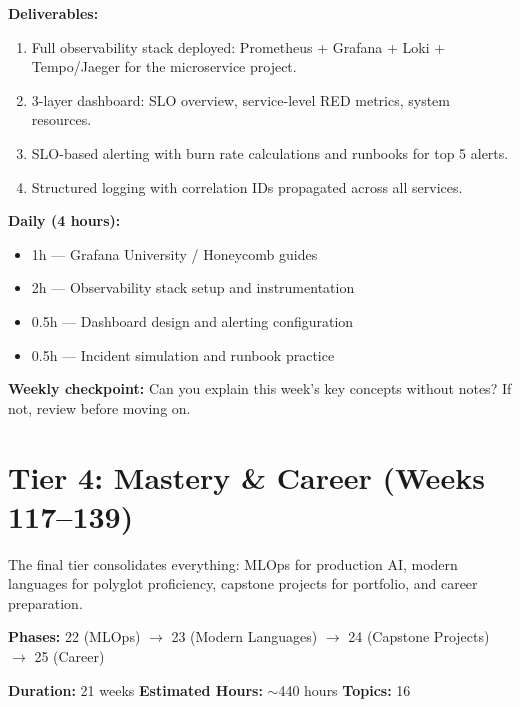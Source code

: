 \documentclass[11pt, a4paper, oneside]{report}
\begin{document}
\begin{milestonebox}
\textbf{Deliverables:}
\begin{enumerate}[leftmargin=*]
\item Full observability stack deployed: Prometheus + Grafana + Loki + Tempo/Jaeger for the microservice project.
\item 3-layer dashboard: SLO overview, service-level RED metrics, system resources.
\item SLO-based alerting with burn rate calculations and runbooks for top 5 alerts.
\item Structured logging with correlation IDs propagated across all services.
\end{enumerate}
\end{milestonebox}

\begin{practicebox}
\textbf{Daily (4 hours):}
\begin{itemize}[leftmargin=*]
\item 1h --- Grafana University / Honeycomb guides
\item 2h --- Observability stack setup and instrumentation
\item 0.5h --- Dashboard design and alerting configuration
\item 0.5h --- Incident simulation and runbook practice
\end{itemize}


\textbf{Weekly checkpoint:} Can you explain this week's key concepts without notes? If not, review before moving on.
\end{practicebox}


\chapter[Tier 4: Mastery]{Tier 4: Mastery \& Career (Weeks 117--139)}

\begin{tieroverviewbox}[title={\textbf{Tier Overview}}]
The final tier consolidates everything: MLOps for production AI, modern languages for polyglot proficiency, capstone projects for portfolio, and career preparation.

\textbf{Phases:} 22 (MLOps) $\to$ 23 (Modern Languages) $\to$ 24 (Capstone Projects) $\to$ 25 (Career)

\textbf{Duration:} 21 weeks \quad \textbf{Estimated Hours:} $\sim$440 hours \quad \textbf{Topics:} 16
\end{tieroverviewbox}
\clearpage
\end{document}

